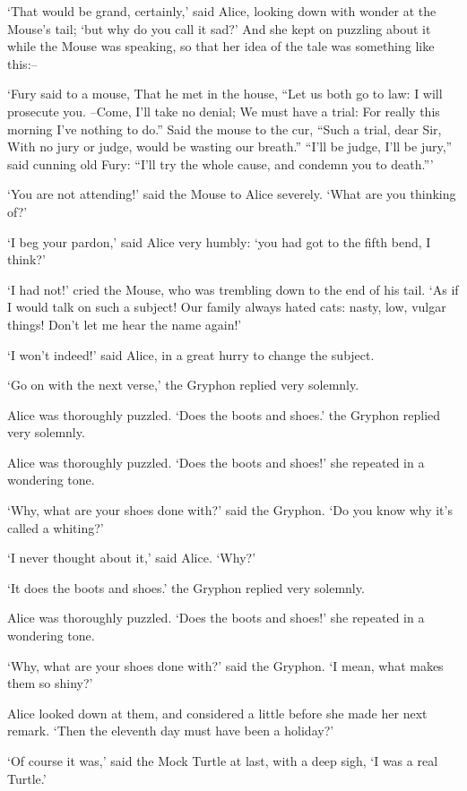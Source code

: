 \documentclass[statementpaper,twoside,openany]{memoir}
\begin{document}
`That would be grand, certainly,' said Alice, looking down with wonder at the Mouse's tail; `but why do you call it sad?' And she kept on puzzling about it while the Mouse was speaking, so that her idea of the tale was something like this:--

`Fury said to a mouse, That he met in the house, ``Let us both go to law: I will prosecute you. --Come, I'll take no denial; We must have a trial: For really this morning I've nothing to do.'' Said the mouse to the cur, ``Such a trial, dear Sir, With no jury or judge, would be wasting our breath.'' ``I'll be judge, I'll be jury,'' said cunning old Fury: ``I'll try the whole cause, and condemn you to death.'''

`You are not attending!' said the Mouse to Alice severely. `What are you thinking of?'

`I beg your pardon,' said Alice very humbly: `you had got to the fifth bend, I think?'

`I had not!' cried the Mouse, who was trembling down to the end of his tail. `As if I would talk on such a subject! Our family always hated cats: nasty, low, vulgar things! Don't let me hear the name again!'

`I won't indeed!' said Alice, in a great hurry to change the subject.

`Go on with the next verse,' the Gryphon replied very solemnly.

Alice was thoroughly puzzled. `Does the boots and shoes.' the Gryphon replied very solemnly.

Alice was thoroughly puzzled. `Does the boots and shoes!' she repeated in a wondering tone.

`Why, what are your shoes done with?' said the Gryphon. `Do you know why it's called a whiting?'

`I never thought about it,' said Alice. `Why?'

`It does the boots and shoes.' the Gryphon replied very solemnly.

Alice was thoroughly puzzled. `Does the boots and shoes!' she repeated in a wondering tone.

`Why, what are your shoes done with?' said the Gryphon. `I mean, what makes them so shiny?'

Alice looked down at them, and considered a little before she made her next remark. `Then the eleventh day must have been a holiday?'

`Of course it was,' said the Mock Turtle at last, with a deep sigh, `I was a real Turtle.'
\end{document}
